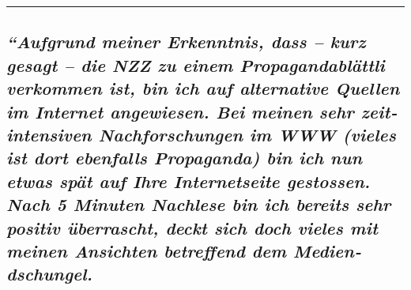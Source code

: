\begin{center}\rule{0.5\linewidth}{\linethickness}\end{center}

\hypertarget{aufgrund-meiner-erkenntnis-dass--kurz-gesagt--die-nzz-zu-einem-propagandabluxe4ttli-verkommen-ist-bin-ich-auf-alternative-quellen-im-internet-angewiesen-bei-meinen-sehr-zeitintensiven-nachforschungen-im-www-vieles-ist-dort-ebenfalls-propaganda-bin-ich-nun-etwas-spuxe4t-auf-ihre-internetseite-gestossen-nach-5-minuten-nachlese-bin-ich-bereits-sehr-positiv-uxfcberrascht-deckt-sich-doch-vieles-mit-meinen-ansichten-betreffend-dem-mediendschungel}{%
\subsection{\texorpdfstring{\emph{``Aufgrund meiner Erkenntnis, dass --
kurz gesagt -- die NZZ zu einem Propaganda­blättli verkommen ist, bin
ich auf alter­native Quellen im Internet angewiesen. Bei meinen sehr
zeit­intensiven Nach­for­schungen im WWW (vieles ist dort ebenfalls
Propaganda) bin ich nun etwas spät auf Ihre Inter­net­seite gestossen.
Nach 5 Minuten Nachlese bin ich bereits sehr positiv überrascht, deckt
sich doch vieles mit meinen Ansichten betreffend dem
Medien­dschungel.}}{``Aufgrund meiner Erkenntnis, dass -- kurz gesagt -- die NZZ zu einem Propaganda­blättli verkommen ist, bin ich auf alter­native Quellen im Internet angewiesen. Bei meinen sehr zeit­intensiven Nach­for­schungen im WWW (vieles ist dort ebenfalls Propaganda) bin ich nun etwas spät auf Ihre Inter­net­seite gestossen. Nach 5 Minuten Nachlese bin ich bereits sehr positiv überrascht, deckt sich doch vieles mit meinen Ansichten betreffend dem Medien­dschungel.}}\label{aufgrund-meiner-erkenntnis-dass--kurz-gesagt--die-nzz-zu-einem-propagandabluxe4ttli-verkommen-ist-bin-ich-auf-alternative-quellen-im-internet-angewiesen-bei-meinen-sehr-zeitintensiven-nachforschungen-im-www-vieles-ist-dort-ebenfalls-propaganda-bin-ich-nun-etwas-spuxe4t-auf-ihre-internetseite-gestossen-nach-5-minuten-nachlese-bin-ich-bereits-sehr-positiv-uxfcberrascht-deckt-sich-doch-vieles-mit-meinen-ansichten-betreffend-dem-mediendschungel}}

